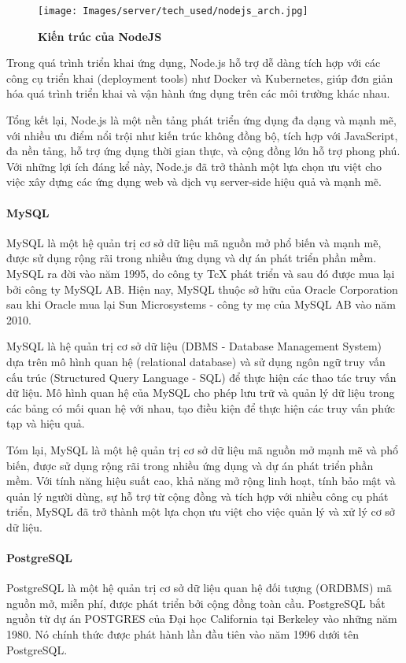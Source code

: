 \begin{figure}[H]
  \centering
  \texttt{[image: Images/server/tech\_used/nodejs\_arch.jpg]}
  \caption[Kiến trúc của NodeJS]{\bfseries \fontsize{12pt}{0pt}
  \selectfont Kiến trúc của NodeJS}
  \label{ble_services} %
\end{figure}
Trong quá trình triển khai ứng dụng, Node.js hỗ trợ dễ dàng tích hợp với các công cụ triển khai (deployment tools) như Docker và Kubernetes, giúp đơn giản hóa quá trình triển khai và vận hành ứng dụng trên các môi trường khác nhau.

Tổng kết lại, Node.js là một nền tảng phát triển ứng dụng đa dạng và mạnh mẽ, với nhiều ưu điểm nổi trội như kiến trúc không đồng bộ, tích hợp với JavaScript, đa nền tảng, hỗ trợ ứng dụng thời gian thực, và cộng đồng lớn hỗ trợ phong phú. Với những lợi ích đáng kể này, Node.js đã trở thành một lựa chọn ưu việt cho việc xây dựng các ứng dụng web và dịch vụ server-side hiệu quả và mạnh mẽ.

\paragraph{MySQL}
\mbox{}

MySQL là một hệ quản trị cơ sở dữ liệu mã nguồn mở phổ biến và mạnh mẽ, được sử dụng rộng rãi trong nhiều ứng dụng và dự án phát triển phần mềm. MySQL ra đời vào năm 1995, do công ty TcX phát triển và sau đó được mua lại bởi công ty MySQL AB. Hiện nay, MySQL thuộc sở hữu của Oracle Corporation sau khi Oracle mua lại Sun Microsystems - công ty mẹ của MySQL AB vào năm 2010. \cite{mysql_1}

MySQL là hệ quản trị cơ sở dữ liệu (DBMS - Database Management System) dựa trên mô hình quan hệ (relational database) và sử dụng ngôn ngữ truy vấn cấu trúc (Structured Query Language - SQL) để thực hiện các thao tác truy vấn dữ liệu. Mô hình quan hệ của MySQL cho phép lưu trữ và quản lý dữ liệu trong các bảng có mối quan hệ với nhau, tạo điều kiện để thực hiện các truy vấn phức tạp và hiệu quả. \cite{myql_2}

Tóm lại, MySQL là một hệ quản trị cơ sở dữ liệu mã nguồn mở mạnh mẽ và phổ biến, được sử dụng rộng rãi trong nhiều ứng dụng và dự án phát triển phần mềm. Với tính năng hiệu suất cao, khả năng mở rộng linh hoạt, tính bảo mật và quản lý người dùng, sự hỗ trợ từ cộng đồng và tích hợp với nhiều công cụ phát triển, MySQL đã trở thành một lựa chọn ưu việt cho việc quản lý và xử lý cơ sở dữ liệu.

\paragraph{PostgreSQL}
\mbox{}
PostgreSQL là một hệ quản trị cơ sở dữ liệu quan hệ đối tượng (ORDBMS) mã nguồn mở, miễn phí, được phát triển bởi cộng đồng toàn cầu. PostgreSQL bắt nguồn từ dự án POSTGRES của Đại học California tại Berkeley vào những năm 1980. Nó chính thức được phát hành lần đầu tiên vào năm 1996 dưới tên PostgreSQL.

